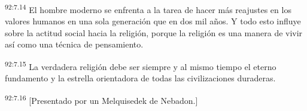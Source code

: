 \par
\textsuperscript{92:7.14} El hombre moderno se enfrenta a la tarea de hacer más reajustes en los valores humanos en una sola generación que en dos mil años. Y todo esto influye sobre la actitud social hacia la religión, porque la religión es una manera de vivir así como una técnica de pensamiento.

\par
\textsuperscript{92:7.15} La verdadera religión debe ser siempre y al mismo tiempo el eterno fundamento y la estrella orientadora de todas las civilizaciones duraderas.

\par
\textsuperscript{92:7.16} [Presentado por un Melquisedek de Nebadon.]
